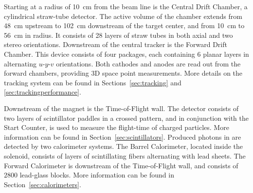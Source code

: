 


Starting at a radius of 10~cm from the beam line is the Central Drift Chamber, a cylindrical straw-tube detector. The active volume of the chamber extends from 48~cm upstream to 102~cm downstream of the target center, and from 10~cm to 56~cm in radius. It consists of 28 layers of straw tubes in both axial and two stereo orientations. Downstream of the central tracker is the Forward Drift Chamber. This device consists of four packages, each containing 6 planar layers in alternating $u$-$y$-$v$ orientations. Both cathodes and anodes are read out from the forward chambers, providing 3D space point measurements. More details on the tracking system can be found in Sections~\ref{sec:tracking} and \ref{sec:trackingperformance}. 

Downstream of the magnet is the Time-of-Flight wall. The detector consists of two layers of scintillator paddles in a crossed pattern, and in conjunction with the Start Counter, is used to measure the flight-time of charged particles. More information can be found in Section~\ref{sec:scintillators}. 
Produced photons in \gx{} are detected by two calorimeter systems. The Barrel Calorimeter, located inside the solenoid, consists of layers of scintillating fibers alternating with lead sheets. The Forward Calorimeter is downstream of the Time-of-Flight wall, and consists of $2800$ lead-glass blocks. More information can be found in Section~\ref{sec:calorimeters}.

